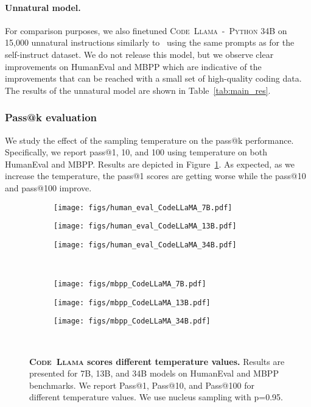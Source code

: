\documentclass[10pt]{article}
\newcommand{\model}{\textsc{Code~Llama}\xspace}
\newcommand{\pymodel}{\textsc{Code~Llama~-~Python}\xspace}
\begin{document}
\paragraph{Unnatural model.} For comparison purposes, we also finetuned \pymodel 34B on 15,000 unnatural instructions similarly to~\citet{honovich2022unnatural} using the same prompts as for the self-instruct dataset. We do not release this model, but we observe clear improvements on HumanEval and MBPP which are indicative of the improvements that can be reached with a small set of high-quality coding data. The results of the unnatural model are shown in Table~\ref{tab:main_res}. 



\subsubsection{Pass@k evaluation} We study the effect of the sampling temperature on the pass@k performance. Specifically, we report pass@1, 10, and 100 using temperature  on both HumanEval and MBPP. Results are depicted in Figure~\ref{fig:abb_temp}. As expected, as we increase the temperature, the pass@1 scores are getting worse while the pass@10 and pass@100 improve. 

\begin{figure}[t!]
     \centering
     \begin{subfigure}[b]{0.32\textwidth}
         \centering
         \texttt{[image: figs/human\_eval\_CodeLLaMA\_7B.pdf]}         
     \end{subfigure}
     \hfill
     \begin{subfigure}[b]{0.32\textwidth}
         \centering
         \texttt{[image: figs/human\_eval\_CodeLLaMA\_13B.pdf]}
     \end{subfigure}
     \hfill
     \begin{subfigure}[b]{0.32\textwidth}
         \centering
         \texttt{[image: figs/human\_eval\_CodeLLaMA\_34B.pdf]}
     \end{subfigure} \\
     \begin{subfigure}[b]{0.32\textwidth}
         \centering
         \texttt{[image: figs/mbpp\_CodeLLaMA\_7B.pdf]}
     \end{subfigure}
     \hfill
     \begin{subfigure}[b]{0.32\textwidth}
         \centering
         \texttt{[image: figs/mbpp\_CodeLLaMA\_13B.pdf]}
     \end{subfigure}
     \hfill
     \begin{subfigure}[b]{0.32\textwidth}
         \centering
         \texttt{[image: figs/mbpp\_CodeLLaMA\_34B.pdf]}
     \end{subfigure} \\
    \caption{\textbf{\model scores different temperature values.} Results are presented for 7B, 13B, and 34B models on HumanEval and MBPP benchmarks. We report Pass@1, Pass@10, and Pass@100 for different temperature values. We use nucleus sampling with p=0.95.}
    \label{fig:abb_temp}
\end{figure}
 
\end{document}
